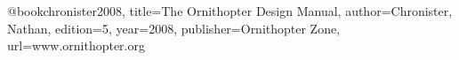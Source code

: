 @book{chronister2008,
  title={The Ornithopter Design Manual},
  author={Chronister, Nathan},
  edition={5},
  year={2008},
  publisher={Ornithopter Zone},
  url={www.ornithopter.org}
}